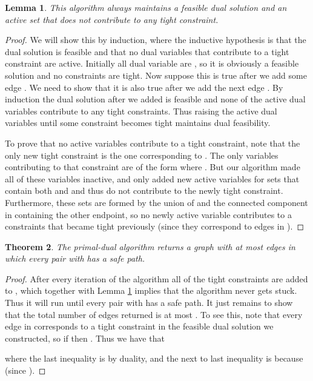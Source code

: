 \documentclass[11pt,letterpaper]{article}
\newtheorem{theorem}{Theorem}[section]
\newtheorem{lemma}[theorem]{Lemma}
\theoremstyle{definition}
\newcounter{note}[section]
\begin{document}
\begin{lemma} \label{lem:PD_feasible} This algorithm always maintains
  a feasible dual solution and an active set that does not contribute
  to any tight constraint.
\end{lemma}
\begin{proof}
  We will show this by induction, where the inductive hypothesis is
  that the dual solution is feasible and that no dual variables that
  contribute to a tight constraint are active.  Initially all dual
  variable are , so it is obviously a feasible solution and no
  constraints are tight.  Now suppose this is true after we add some
  edge .  We need to show that it is also true after we add the
  next edge .  By induction the dual solution after we
  added  is feasible and none of the active dual variables
  contribute to any tight constraints.  Thus raising the active dual
  variables until some constraint becomes tight maintains dual
  feasibility.

  To prove that no active variables contribute to a tight constraint,
  note that the only new tight constraint is the one corresponding to
  .  The only variables contributing to that constraint are of the
  form  where .  But our algorithm
  made all of these variables inactive, and only added new active
  variables for sets  that contain both  and  and thus do
  not contribute to the newly tight constraint.  Furthermore, these
  sets  are formed by the union of  and the connected component
  in  containing the other endpoint, so no newly active
  variable contributes to a constraints that became tight previously
  (since they correspond to edges in ).
\end{proof}

\begin{theorem} \label{thm:PD_main}
  The primal-dual algorithm returns a graph  with at most  edges in which every pair  with 
  has a safe path.
\end{theorem}
\begin{proof}
  After every iteration of the algorithm all of the tight constraints
  are added to , which together with Lemma \ref{lem:PD_feasible}
  implies that the algorithm never gets stuck.  Thus it will run until
  every pair  with  has a safe path.  It just
  remains to show that the total number of edges returned is at most
  .  To see this, note that every edge in 
  corresponds to a tight constraint in the feasible dual solution we
  constructed, so if  then .  Thus
  we have that
  
  where the last inequality is by duality, and the next to last
  inequality is because  (since ).
\end{proof}
\end{document}
